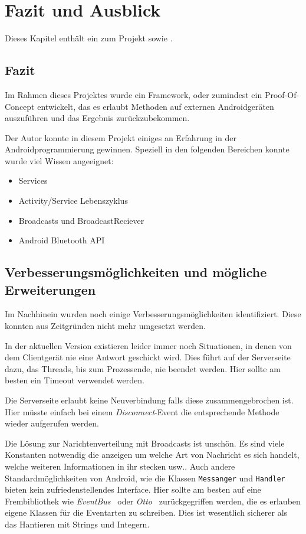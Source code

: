 \chapter{Fazit und Ausblick}\label{chap:fazit}
%
Dieses Kapitel enthält ein  zum Projekt sowie .
%
\section{Fazit}\label{sec:fazit}
%
Im Rahmen dieses Projektes wurde ein Framework, oder zumindest ein Proof-Of-Concept entwickelt, das es erlaubt Methoden auf externen Androidgeräten auszuführen und das Ergebnis zurückzubekommen.

Der Autor konnte in diesem Projekt einiges an Erfahrung in der Androidprogrammierung gewinnen. Speziell in den folgenden Bereichen konnte wurde viel Wissen angeeignet:
\begin{itemize}
  \item Services
  \item Activity/Service Lebenszyklus
  \item Broadcasts und BroadcastReciever
  \item Android Bluetooth API
\end{itemize}

\section{Verbesserungsmöglichkeiten und mögliche Erweiterungen}\label{sec:ve}
%
Im Nachhinein wurden noch einige Verbesserungsmöglichkeiten identifiziert. Diese konnten aus Zeitgründen nicht mehr umgesetzt werden.

In der aktuellen Version existieren leider immer noch Situationen, in denen von dem Clientgerät nie eine Antwort geschickt wird. Dies führt auf der Serverseite dazu, das Threads, bis zum Prozessende, nie beendet werden. Hier sollte am besten ein Timeout verwendet werden.

Die Serverseite erlaubt keine Neuverbindung falls diese zusammengebrochen ist. Hier müsste einfach bei einem \emph{Disconnect}-Event die entsprechende Methode wieder aufgerufen werden.

Die Lösung zur Narichtenverteilung mit Broadcasts ist unschön. Es sind viele Konstanten notwendig die anzeigen um welche Art von Nachricht es sich handelt, welche weiteren Informationen in ihr stecken usw.. Auch andere Standardmöglichkeiten von Android, wie die Klassen \lstinline{Messanger} und \lstinline{Handler} bieten kein zufriedenstellendes Interface. Hier sollte am besten auf eine Frembibliothek wie \emph{EventBus}~\cite{greenrobot2015} oder \emph{Otto}~\cite{Square2013} zurückgegriffen werden, die es erlauben eigene Klassen für die Eventarten zu schreiben. Dies ist wesentlich sicherer als das Hantieren mit Strings und Integern.

